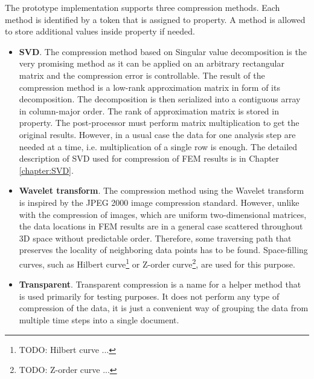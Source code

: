 The prototype implementation supports three compression methods. Each method is identified by a token that is assigned to  property. A method is allowed to store additional values inside  property if needed.

\begin{itemize}
    
    \item \textbf{SVD}. The compression method based on Singular value decomposition is the very promising method as it can be applied on an arbitrary rectangular matrix and the compression error is controllable. The result of the compression method is a low-rank approximation matrix in form of its decomposition. The decomposition is then serialized into a contiguous array in column-major order. The rank of approximation matrix is stored in  property. The post-processor must perform matrix multiplication to get the original results. However, in a usual case the data for one analysis step are needed at a time, i.e. multiplication of a single row is enough. The detailed description of SVD used for compression of FEM results is in Chapter \ref{chapter:SVD}.

    \item \textbf{Wavelet transform}. The compression method using the Wavelet transform is inspired by the JPEG 2000 image compression standard. However, unlike with the compression of images, which are uniform two-dimensional matrices, the data locations in FEM results are in a general case scattered throughout 3D space without predictable order. Therefore, some traversing path that preserves the locality of neighboring data points has to be found. Space-filling curves, such as Hilbert curve\footnote{TODO: Hilbert curve ...} or Z-order curve\footnote{TODO: Z-order curve ...}, are used for this purpose.
    
    \item \textbf{Transparent}. Transparent compression is a name for a helper method that is used primarily for testing purposes. It does not perform any type of compression of the data, it is just a convenient way of grouping the data from multiple time steps into a single document.

\end{itemize}

